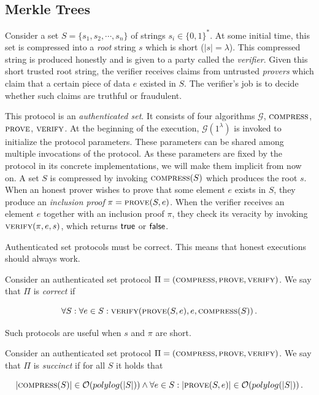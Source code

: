 \subsection{Merkle Trees}
Consider a set $S = \{s_1, s_2, \cdots, s_n\}$ of strings
$s_i \in \{0, 1\}^*$. At some initial time, this set is compressed into a
\emph{root} string $s$ which is short ($|s| = \lambda$). This compressed string
is produced honestly and is given to a party called the \emph{verifier}. Given
this short trusted root string, the verifier receives claims from untrusted
\emph{provers} which claim that a certain piece of data $e$ existed in $S$.
The verifier's job is to decide whether such claims are truthful or fraudulent.

This protocol is an \emph{authenticated set}. It consists of
four algorithms $\mathcal{G}$, $\textsc{compress}$, $\textsc{prove}$,
$\textsc{verify}$. At the beginning of the execution, $\mathcal{G}(1^\lambda)$
is invoked to initialize the protocol parameters. These parameters can be shared
among multiple invocations of the protocol. As these parameters are fixed by the
protocol in its concrete implementations, we will make them implicit from now
on. A set $S$ is compressed by invoking $\textsc{compress}(S)$
which produces the root $s$. When an honest prover wishes to prove that some
element $e$ exists in $S$, they produce an \emph{inclusion proof} $\pi =
\textsc{prove}(S, e)$. When the verifier receives an element $e$ together
with an inclusion proof $\pi$, they check its veracity by invoking
$\textsc{verify}(\pi, e, s)$, which returns $\textsf{true}$ or $\textsf{false}$.

Authenticated set protocols must be correct. This means that honest
executions should always work.

\begin{definition}[Correctness]
  Consider an authenticated set protocol
  $\Pi = (\textsc{compress},\allowbreak \textsc{prove},\allowbreak \textsc{verify})$.
  We say that $\Pi$ is
  \emph{correct} if

  \[\forall S:
    \forall e \in S:
    \textsc{verify}(\textsc{prove}(S, e), e, \textsc{compress}(S))\,.\]
\end{definition}

Such protocols are useful when $s$ and $\pi$ are short.

\begin{definition}[Succinctness]
  Consider an authenticated set protocol
  $\Pi = (\textsc{compress},\allowbreak \textsc{prove},\allowbreak \textsc{verify})$.
  We say that $\Pi$ is
  \emph{succinct} if
  for all $S$ it holds that

  \[|\textsc{compress}(S)| \in \mathcal{O}(polylog(|S|))
    \land
    \forall e \in S:
    |\textsc{prove}(S, e)| \in \mathcal{O}(polylog(|S|))
    \,.\]
\end{definition}

